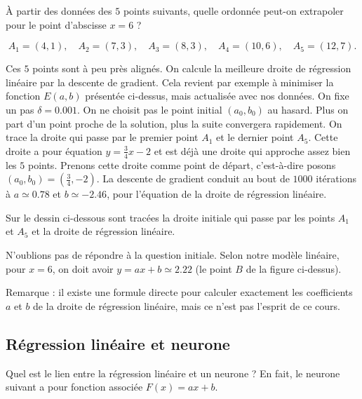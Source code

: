 \documentclass[11pt,class=report,crop=false]{standalone}
\begin{document}
\begin{exemple}
\`A partir des données des $5$ points suivants, quelle ordonnée peut-on extrapoler pour le point d'abscisse $x=6$ ?

$$A_1 = (4,1),\quad A_2 = (7,3),\quad A_3 = (8,3),\quad A_4 = (10,6),\quad A_5 = (12,7).$$

Ces $5$ points sont à peu près alignés. On calcule la meilleure droite de régression linéaire par la descente de gradient. Cela revient par exemple à minimiser la fonction $E(a,b)$ présentée ci-dessus, mais actualisée avec nos données. 
On fixe un pas $\delta = 0.001$.
On ne choisit pas le point initial $(a_0,b_0)$ au hasard. Plus on part d'un point proche de la solution, plus la suite convergera rapidement. On trace la droite qui passe par le premier point $A_1$ et le dernier point $A_5$. Cette droite a pour équation $y=\frac34 x -2$ et est déjà une droite qui approche assez bien les $5$ points. Prenons cette droite comme point de départ, c'est-à-dire posons $(a_0,b_0) = (\frac34,-2)$.
La descente de gradient conduit au bout de $1000$ itérations à $a\simeq 0.78$ et $b\simeq -2.46$, pour l'équation de la droite de régression linéaire.

Sur le dessin ci-dessous sont tracées la droite initiale qui passe par les points $A_1$ et $A_5$ et la droite de régression linéaire.


N'oublions pas de répondre à la question initiale. Selon notre modèle linéaire, pour $x=6$, on doit avoir $y=ax+b \simeq 2.22$ (le point $B$ de la figure ci-dessus).
\end{exemple}

Remarque : il existe une formule directe pour calculer exactement les coefficients $a$ et $b$ de la droite de régression linéaire, mais ce n'est pas l'esprit de ce cours.


\subsection{Régression linéaire et neurone}

Quel est le lien entre la régression linéaire et un neurone ?
En fait, le neurone suivant a pour fonction associée $F(x) = ax+b$.

\end{document}
